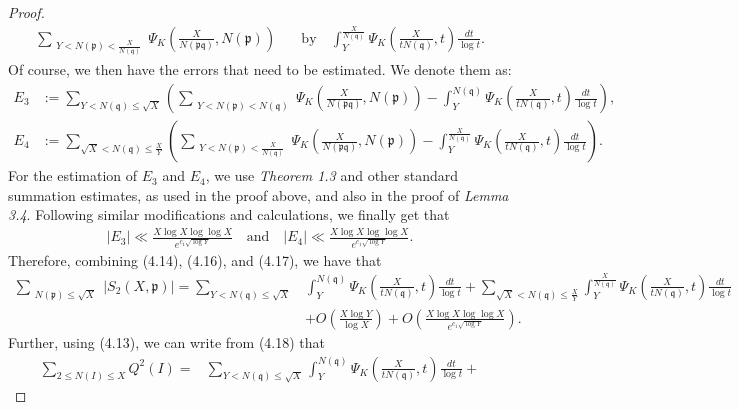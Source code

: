 \documentclass[10pt,a4paper]{amsart}
\begin{document}
\begin{proof}
\begin{align}
     \sum_{\substack{Y<N(\mathfrak{p})<\frac{X}{N(\mathfrak{q})} }} \Psi_K\left(\frac{X}{N(\mathfrak{p}\mathfrak{q})},N(\mathfrak{p})\right) \quad &\text{by} \quad \int_Y^{\frac{X}{N(\mathfrak{q})}} \Psi_K\left(\frac{X}{tN(\mathfrak{q})},t\right)\frac{dt}{\log t}. \nonumber
\end{align}
Of course, we then have the errors that need to be estimated. We denote them as:
\begin{align}
    E_3&:=\sum_{Y<N(\mathfrak{q})\leq \sqrt{X}}\left(\sum_{\substack{Y<N(\mathfrak{p})<N(\mathfrak{q}) }} \Psi_K\left(\frac{X}{N(\mathfrak{p}\mathfrak{q})},N(\mathfrak{p})\right) - \int_Y^{N(\mathfrak{q})} \Psi_K\left(\frac{X}{tN(\mathfrak{q})},t\right)\frac{dt}{\log t}\right), \nonumber \\
     E_4 &:=\sum_{\sqrt{X}<N(\mathfrak{q})\leq \frac{X}{Y}}\left(\sum_{\substack{Y<N(\mathfrak{p})<\frac{X}{N(\mathfrak{q})}}} \Psi_K\left(\frac{X}{N(\mathfrak{p}\mathfrak{q})},N(\mathfrak{p})\right)-\int_Y^{\frac{X}{N(\mathfrak{q})}} \Psi_K\left(\frac{X}{tN(\mathfrak{q})},t\right)\frac{dt}{\log t}\right). \nonumber
\end{align}
For the estimation of $E_3$ and $E_4$, we use \textit{Theorem 1.3} and other standard summation estimates, as used in the proof above, and also in the proof of \textit{Lemma 3.4}. Following similar modifications and calculations, we finally get that
\begin{align}
    |E_3| \ll \frac{X\log X \log\log X}{e^{c_1\sqrt{\log Y}}} \quad \text{and} \quad |E_4| \ll \frac{X\log X \log\log X}{e^{c_1\sqrt{\log Y}}}.
\end{align}
Therefore, combining (4.14), (4.16), and (4.17), we have that
\begin{align}
    \sum_{\substack{N(\mathfrak{p}) \leq \sqrt{X} }} |S_2(X,\mathfrak{p})| = \sum_{Y<N(\mathfrak{q})\leq \sqrt{X}}&\int_Y^{N(\mathfrak{q})} \Psi_K\left(\frac{X}{tN(\mathfrak{q})},t\right)\frac{dt}{\log t} +
\sum_{\sqrt{X}<N(\mathfrak{q})\leq \frac{X}{Y}}\int_Y^{\frac{X}{N(\mathfrak{q})}} \Psi_K\left(\frac{X}{tN(\mathfrak{q})},t\right)\frac{dt}{\log t}\nonumber \\&+O\left(\frac{X\log Y}{\log X}\right)+O\left(\frac{X\log X\log \log X}{e^{c_1\sqrt{\log Y}}}\right).
\end{align}
Further, using (4.13), we can write from (4.18) that
\begin{align}
    \sum_{2\leq N(I)\leq X} Q^2(I) = & \sum_{Y<N(\mathfrak{q})\leq \sqrt{X}}\int_Y^{N(\mathfrak{q})} \Psi_K\left(\frac{X}{tN(\mathfrak{q})},t\right)\frac{dt}{\log t} +

\end{align}
\end{proof}
\end{document}
